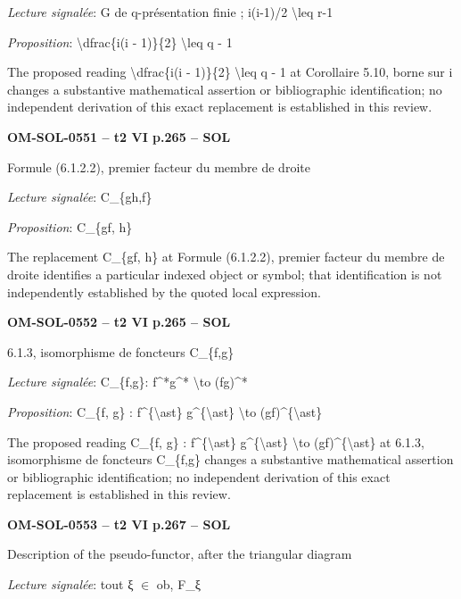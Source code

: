 \emph{Lecture signalée}: G de q-présentation finie ; i(i-1)/2 \textbackslash{}leq r-1\par
\emph{Proposition}: \textbackslash{}dfrac\{i(i - 1)\}\{2\} \textbackslash{}leq q - 1\par
The proposed reading \textbackslash{}dfrac\{i(i - 1)\}\{2\} \textbackslash{}leq q - 1 at Corollaire 5.10, borne sur i changes a substantive mathematical assertion or bibliographic identification; no independent derivation of this exact replacement is established in this review.\par
\par\noindent\textbf{OM-SOL-0551 -- t2 VI p.265 -- SOL}\par
Formule (6.1.2.2), premier facteur du membre de droite\par
\emph{Lecture signalée}: C\_\{gh,f\}\par
\emph{Proposition}: C\_\{gf, h\}\par
The replacement C\_\{gf, h\} at Formule (6.1.2.2), premier facteur du membre de droite identifies a particular indexed object or symbol; that identification is not independently established by the quoted local expression.\par
\par\noindent\textbf{OM-SOL-0552 -- t2 VI p.265 -- SOL}\par
6.1.3, isomorphisme de foncteurs C\_\{f,g\}\par
\emph{Lecture signalée}: C\_\{f,g\}: f\textasciicircum{}*g\textasciicircum{}* \textbackslash{}to (fg)\textasciicircum{}*\par
\emph{Proposition}: C\_\{f, g\} : f\textasciicircum{}\{\textbackslash{}ast\} g\textasciicircum{}\{\textbackslash{}ast\} \textbackslash{}to (gf)\textasciicircum{}\{\textbackslash{}ast\}\par
The proposed reading C\_\{f, g\} : f\textasciicircum{}\{\textbackslash{}ast\} g\textasciicircum{}\{\textbackslash{}ast\} \textbackslash{}to (gf)\textasciicircum{}\{\textbackslash{}ast\} at 6.1.3, isomorphisme de foncteurs C\_\{f,g\} changes a substantive mathematical assertion or bibliographic identification; no independent derivation of this exact replacement is established in this review.\par
\par\noindent\textbf{OM-SOL-0553 -- t2 VI p.267 -- SOL}\par
Description of the pseudo-functor, after the triangular diagram\par
\emph{Lecture signalée}: tout ξ \ensuremath{\in} ob, F\_ξ\par
